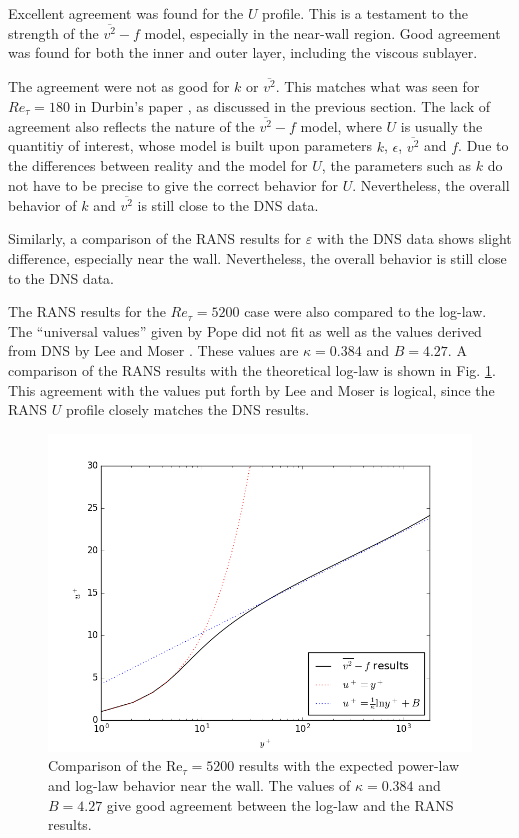 \documentclass[a4paper,11pt]{article}
\begin{document}
Excellent agreement was found for the $U$ profile.  This is a testament to the strength of the $\overline{v^2}-f$ model, especially in the near-wall region.  Good agreement was found for both the inner and outer layer, including the viscous sublayer.

The agreement were not as good for $k$ or $\overline{v^2}$.  This matches what was seen for $Re_{\tau} = 180$ in Durbin's paper \cite{durbin180}, as discussed in the previous section.  The lack of agreement also reflects the nature of the $\overline{v^2}-f$ model, where $U$ is usually the quantitiy of interest, whose model is built upon parameters $k$, $\epsilon$, $\overline{v^2}$ and $f$.  Due to the differences between reality and the model for $U$, the parameters such as $k$ do not have to be precise to give the correct behavior for $U$. Nevertheless, the overall behavior of $k$ and $\overline{v^2}$ is still close to the DNS data.

Similarly, a comparison of the RANS results for $\varepsilon$ with the DNS data shows slight difference, especially near the wall. Nevertheless, the overall behavior is still close to the DNS data.

The RANS results for the $Re_{\tau} = 5200$ case were also compared to the
log-law.  The ``universal values'' given by Pope \cite{pope} did not fit as well
as the values derived from DNS by Lee and Moser \cite{Lee}.  These values are $\kappa = 0.384$ and $B = 4.27$.  A comparison of the RANS results with the theoretical log-law is shown in Fig. \ref{fig:loglaw}. This agreement with the values put forth by Lee and Moser is logical, since the RANS $U$ profile closely matches the DNS results.

\begin{figure}
 \centering
 \includegraphics[width=\textwidth]{loglaw_5200}
 \caption{Comparison of the $\mathrm{Re}_{\tau} = 5200$ results with the expected power-law and log-law behavior near the wall. The values of $\kappa = 0.384$ and $B = 4.27$ give good agreement between the log-law and the RANS results.}
 \label{fig:loglaw}
\end{figure}
\end{document}
